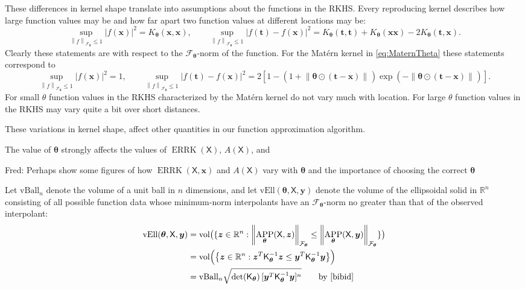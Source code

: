 \documentclass[]{mcom-l}
\theoremstyle{remark}
\newcommand{\vBall}{\text{vBall}_n}
\newcommand{\vEll}{\text{vEll}}
\DeclareMathOperator{\vol}{vol}
\DeclareMathOperator{\errK}{ERRK}
\DeclareMathOperator{\APP}{APP}
\newcommand{\reals}{{\mathbb{R}}}
\newcommand{\mK}{\mathsf{K}}
\newcommand{\mX}{\mathsf{X}}
\newcommand{\bx}{{\boldsymbol{x}}}
\newcommand{\by}{{\boldsymbol{y}}}
\newcommand{\bt}{{\boldsymbol{t}}}
\newcommand{\bz}{{\boldsymbol{z}}}
\newcommand{\btheta}{{\boldsymbol{\theta}}}
\newcommand{\calf}{{\mathcal{F}}}
\def\abs#1{\ensuremath{\left \lvert #1 \right \rvert}}
\newcommand{\norm}[2][{}]{\ensuremath{\left \lVert #2 \right \rVert}_{#1}}
\newcommand{\FredNote}[1]{{\color{blue}Fred: #1}}
\begin{document}
These differences in kernel shape translate into assumptions about the functions in the RKHS.  Every reproducing kernel describes how large function values may be and how far apart two function values at different locations may be:
\begin{equation} \label{eq:diff_f}
\sup_{\norm[\calf_{\btheta}]{f} \le 1} \abs{f(\bx)}^2 = K_\btheta(\bx,\bx), \qquad    \sup_{\norm[\calf_{\btheta}]{f} \le 1} \abs{f(\bt) - f(\bx)}^2 = K_{\btheta}(\bt,\bt) +  K_{\btheta}(\bx\bx) - 2 K_{\btheta}(\bt,\bx).
\end{equation}
Clearly these statements are with respect to the $\calf_\btheta$-norm of the function.  For the Mat\'ern kernel in \eqref{eq:MaternTheta} these statements correspond to 
\begin{equation} \label{eq:diff_f_Matern}
\sup_{\norm[\calf_{\btheta}]{f} \le 1} \abs{f(\bx)}^2 = 1, \qquad 
\sup_{\norm[\calf_{\btheta}]{f} \le 1} \abs{f(\bt) - f(\bx)}^2 = 2[1 - (1 +  \norm{\btheta \odot (\bt-\bx)}) \exp(-\norm{\btheta \odot (\bt-\bx)})].
\end{equation}
For small $\theta$ function values in the RKHS characterized by the Mat\'ern kernel do not vary much with location. For large $\theta$ function values in the RKHS may vary quite a bit over short distances.

These variations in kernel shape, affect other quantities in our function approximation algorithm.


The value of $\btheta$ strongly affects the values of $\errK(\mX)$, $A(\mX)$, and 

\FredNote{Perhaps show some figures of how $\errK(\mX,\bx)$ and $A(\mX)$ vary with $\btheta$ and the importance of choosing the correct $\btheta$}

Let $\vBall$ denote the volume of a unit ball in $n$ dimensions, and let $\vEll(\btheta,\mX,\by)$ denote the volume of the ellipsoidal solid in $\reals^n$ consisting of all possible function data whose minimum-norm interpolants have an $\calf_{\btheta}$-norm no greater than that of the observed interpolant:
\begin{align*}
\vEll(\btheta,\mX,\by) &= \vol\bigl(\{ \bz \in \reals^n : \norm[\calf_{\btheta}]{\APP_{\btheta}(\mX,\bz)}  \le \norm[\calf_{\btheta}]{\APP_{\btheta}(\mX,\by)} \} \bigr) \\
& = \vol\Bigl( \bigl \{ \bz \in \reals^n : \bz^T \mK_\btheta^{-1} \bz \le \by^T \mK_\btheta^{-1} \by  \bigr \} \Bigr) \\
& = \vBall \sqrt{\det(\mK_{\btheta})  \, [\by^T \mK_\btheta^{-1} \by]^n } \qquad \text{by \cite{bibid}}
\end{align*}
\end{document}
